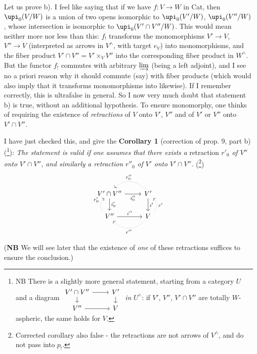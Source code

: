 Let us prove b). I feel like saying that if we have $f : V \longrightarrow W$ in Cat, then $\upi_0(V/W)$ is a union of two opens isomorphic to $\upi_0(V'/W)$, $\upi_0(V''/W)$, whose intersection is isomorphic to $\upi_0(V'\cap V''/W)$. This would mean neither more nor
less than this: $f_!$ transforms the monomorphisms $V' \longrightarrow V$, $V'' \longrightarrow V$ (interpreted as arrows in $V^\wedge$, with target $e_V$) into monomorphisms, and the fiber product $V'\cap V'' = V' \times_V V''$ into the corresponding fiber product in $W^\wedge$. But the functor $f_!$ commutes with arbitrary $\varinjlim$ (being a left adjoint), and I see no a priori reason why it should commute (say) with fiber products (which would also imply that it transforms monomorphisms into likewise). If I remember correctly, this is ultrafalse in general. So I now very much doubt that statement b) is true, without an additional hypothesis. To ensure monomorphy, one thinks of requiring the existence of \textit{retractions} of $V$ onto $V'$, $V''$ and of $V'$ or $V''$ onto $V'\cap V''$.

I have just checked this, and give the
\textbf{Corollary 1} (correction of prop. 9, part b) (\footnote{NB There is a slightly more general statement, starting from a category $U$ and a diagram
$\begin{tikzcd}[ampersand replacement=\&, row sep=small]
V'\cap V'' \arrow[r] \arrow[d] \& V' \arrow[d] \\
V'' \arrow[r] \& V
\end{tikzcd}$
\textit{in} $U^\wedge$: if $V'$, $V''$, $V'\cap V''$ are totally $W$-aspheric, the same holds for $V$.}): \textit{The statement is valid if one assumes that there exists a} retraction \textit{$r'_0$ of $V''$ onto $V'\cap V''$, and similarly a retraction $r''_0$ of $V'$ onto $V'\cap V''$.} (\footnote{Corrected corollary also false - the retractions are not arrows of $V^\wedge$, and do not pass into $p_!$.}) %
\[
\begin{tikzcd}
V'\cap V'' \arrow[r, "i''_0"'] \arrow[d, "i'_0"] & V' \arrow[d, "i'"] \arrow[l, dotted, bend right=50, "r''_0"'] \\
V'' \arrow[r, "i''"] \arrow[u, dotted, bend left=50, "r'_0"] & V \arrow[u, dotted, bend right=50, "r'"'] \arrow[l, dotted, bend left=50, "r''"]
\end{tikzcd}
\]

(\textbf{NB} We will see later that the existence of \textit{one} of these retractions suffices to ensure the conclusion.)

